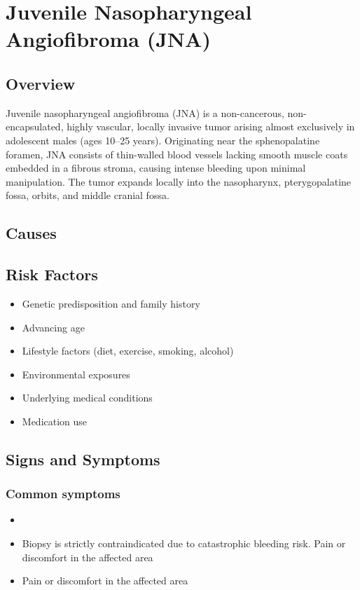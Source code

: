 \chapter{Juvenile Nasopharyngeal Angiofibroma (JNA)}
\label{sec:Juvenile Nasopharyngeal Angiofibroma (JNA)}

\section{Overview}
Juvenile nasopharyngeal angiofibroma (JNA) is a non-cancerous, non-encapsulated, highly vascular, locally invasive tumor arising almost exclusively in adolescent males (ages 10--25 years). Originating near the sphenopalatine foramen, JNA consists of thin-walled blood vessels lacking smooth muscle coats embedded in a fibrous stroma, causing intense bleeding upon minimal manipulation. The tumor expands locally into the nasopharynx, pterygopalatine fossa, orbits, and middle cranial fossa.
\section{Causes}
\section{Risk Factors}

\begin{itemize}[noitemsep]
  \item Genetic predisposition and family history
  \item Advancing age
  \item Lifestyle factors (diet, exercise, smoking, alcohol)
  \item Environmental exposures
  \item Underlying medical conditions
  \item Medication use
\end{itemize}
\section{Signs and Symptoms}

\subsection{Common symptoms}
\begin{itemize}[noitemsep]
  \item \item Biopsy is strictly contraindicated due to catastrophic bleeding risk. Pain or discomfort in the affected area    \item Pain or discomfort in the affected area
  \end{itemize}

